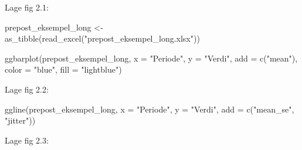 \documentclass[
]{book}
\newenvironment{Shaded}{\begin{snugshade}}{\end{snugshade}}
\newcommand{\AttributeTok}[1]{\textcolor[rgb]{0.77,0.63,0.00}{#1}}
\newcommand{\DecValTok}[1]{\textcolor[rgb]{0.00,0.00,0.81}{#1}}
\newcommand{\FloatTok}[1]{\textcolor[rgb]{0.00,0.00,0.81}{#1}}
\newcommand{\FunctionTok}[1]{\textcolor[rgb]{0.00,0.00,0.00}{#1}}
\newcommand{\NormalTok}[1]{#1}
\newcommand{\OtherTok}[1]{\textcolor[rgb]{0.56,0.35,0.01}{#1}}
\newcommand{\SpecialCharTok}[1]{\textcolor[rgb]{0.00,0.00,0.00}{#1}}
\newcommand{\StringTok}[1]{\textcolor[rgb]{0.31,0.60,0.02}{#1}}
\begin{document}
Lage fig 2.1:

\begin{Shaded}
\begin{Highlighting}[]
\NormalTok{prepost\_eksempel\_long }\OtherTok{\textless{}{-}} \FunctionTok{as\_tibble}\NormalTok{(}\FunctionTok{read\_excel}\NormalTok{(}\StringTok{"prepost\_eksempel\_long.xlsx"}\NormalTok{))}

\FunctionTok{ggbarplot}\NormalTok{(prepost\_eksempel\_long, }\AttributeTok{x =} \StringTok{"Periode"}\NormalTok{, }\AttributeTok{y =} \StringTok{"Verdi"}\NormalTok{, }\AttributeTok{add =} \FunctionTok{c}\NormalTok{(}\StringTok{"mean"}\NormalTok{), }\AttributeTok{color =} \StringTok{"blue"}\NormalTok{, }\AttributeTok{fill =} \StringTok{"lightblue"}\NormalTok{)}
\end{Highlighting}
\end{Shaded}

Lage fig 2.2:

\begin{Shaded}
\begin{Highlighting}[]
\FunctionTok{ggline}\NormalTok{(prepost\_eksempel\_long, }\AttributeTok{x =} \StringTok{"Periode"}\NormalTok{, }\AttributeTok{y =} \StringTok{"Verdi"}\NormalTok{, }\AttributeTok{add =} \FunctionTok{c}\NormalTok{(}\StringTok{"mean\_se"}\NormalTok{, }\StringTok{"jitter"}\NormalTok{))}
\end{Highlighting}
\end{Shaded}

Lage fig 2.3:

\begin{Shaded}
\end{Shaded}
\end{document}
